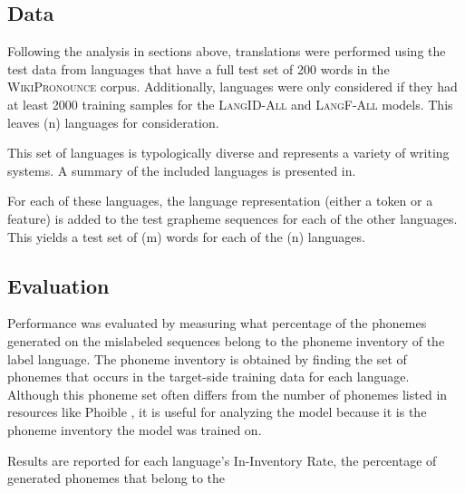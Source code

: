 \subsection{Data}
Following the analysis in sections above, translations were performed using the test data from languages that have a full test set of 200 words in the \textsc{WikiPronounce} corpus. Additionally, languages were only considered if they had at least 2000 training samples for the \textsc{LangID-All} and \textsc{LangF-All} models. This leaves (n) languages for consideration.

This set of languages is typologically diverse and represents a variety of writing systems. A summary of the included languages is presented in.

For each of these languages, the language representation (either a token or a feature) is added to the test grapheme sequences for each of the other languages. This yields a test set of (m) words for each of the (n) languages.


\subsection{Evaluation}
Performance was evaluated by measuring what percentage of the phonemes generated on the mislabeled sequences belong to the phoneme inventory of the label language. The phoneme inventory is obtained by finding the set of phonemes that occurs in the target-side training data for each language. Although this phoneme set often differs from the number of phonemes listed in resources like Phoible \citep{phoible}, it is useful for analyzing the model because it is the phoneme inventory the model was trained on. 

Results are reported for each language's In-Inventory Rate, the percentage of generated phonemes that belong to the 


